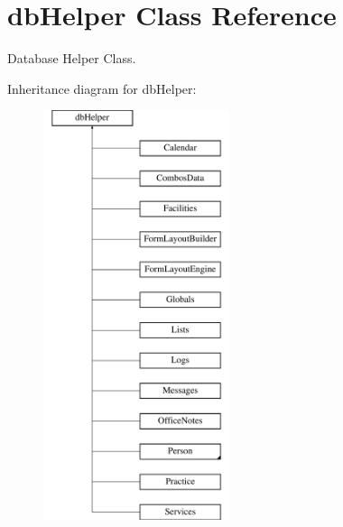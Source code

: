 \hypertarget{classdb_helper}{\section{db\-Helper \-Class \-Reference}
\label{classdb_helper}
}


\-Database \-Helper \-Class.  


\-Inheritance diagram for db\-Helper\-:\begin{figure}[H]
\begin{center}
\leavevmode
\includegraphics[height=12.000000cm]{classdb_helper}
\end{center}
\end{figure}
